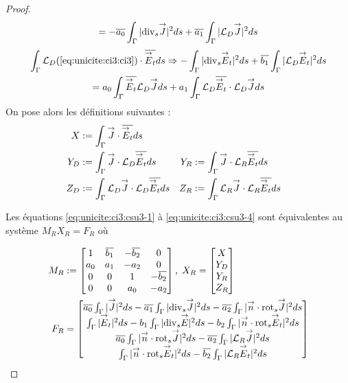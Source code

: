 \begin{proof}
\begin{multline}
      = - \conj{a_0} \int_\Gamma |\tdivs \vJ|^2ds + \conj{a_1} \int_\Gamma | \LD \vJ|^2 ds
    \end{multline}
    \begin{multline}
      \label{eq:unicite:ci3:csu3-6}
      \int_\Gamma  \LD ( \eqref{eq:unicite:ci3:ci3} ) \cdot \conj{\vE_t} ds \Rightarrow
      -\int_\Gamma | \tdivs \vE_t |^2 ds  + \conj{b_1} \int_\Gamma | \LD \vE_t|^2 ds \\
      = a_0 \int_\Gamma \conj{\vE_t} \LD \vJ ds + a_1 \int_\Gamma \LD \conj{\vE_t} \cdot \LD \vJ ds
    \end{multline}
    On pose alors les définitions suivantes :
    \begin{align*}
      X&:= \int_\Gamma \vJ \cdot \conj{\vE_t} ds\\
      Y_D&:= \int_\Gamma \vJ \cdot \LD \conj{\vE_t} ds
      &Y_R&:= \int_\Gamma \vJ \cdot \LR \conj{\vE_t} ds\\
      Z_D&:= \int_\Gamma \LD \vJ \cdot \LD \conj{\vE_t} ds
      &Z_R&:= \int_\Gamma \LR \vJ \cdot \LR \conj{\vE_t} ds
    \end{align*}

    Les équations \eqref{eq:unicite:ci3:csu3-1} à \eqref{eq:unicite:ci3:csu3-4} sont équivalentes au système \(M_R X_R = F_R\) où

    \begin{align*}
      M_R&:=
      \begin{bmatrix}
        1&\conj{b_1}&-\conj{b_2}&0\\
        a_0&a_1&-a_2&0\\
        0&0&1&-\conj{b_2}\\
        0&0&a_0&-a_2\\
      \end{bmatrix},\;
      X_R =
      \begin{bmatrix}
        X\\
        Y_D\\
        Y_R\\
        Z_R
      \end{bmatrix}\\
      F_R &=
      \begin{bmatrix}
        \conj{a_0} \int_\Gamma |\vJ|^2ds - \conj{a_1} \int_\Gamma |\tdivs \vJ|^2 ds - \conj{a_2} \int_\Gamma |\vn \cdot \trots \vJ|^2 ds \\
        \int_\Gamma |\vE_t|^2 ds  - b_1 \int_\Gamma | \tdivs \vE |^2 ds - b_2 \int_\Gamma | \vn \cdot \trots \vE_t|^2 ds \\
        \conj{a_0} \int_\Gamma |\vn \cdot \trots \vJ|^2ds - \conj{a_2} \int_\Gamma | \LR \vJ|^2 ds \\
        \int_\Gamma | \vn \cdot \trots \vE_t |^2 ds  - \conj{b_2} \int_\Gamma | \LR \vE_t|^2 ds
      \end{bmatrix}
    \end{align*}


\end{proof}
